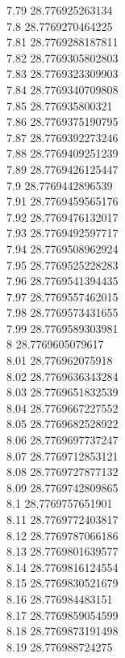 {7.79	28.776925263134\\
7.8	28.7769270464225\\
7.81	28.7769288187811\\
7.82	28.7769305802803\\
7.83	28.7769323309903\\
7.84	28.7769340709808\\
7.85	28.776935800321\\
7.86	28.7769375190795\\
7.87	28.7769392273246\\
7.88	28.7769409251239\\
7.89	28.7769426125447\\
7.9	28.7769442896539\\
7.91	28.7769459565176\\
7.92	28.7769476132017\\
7.93	28.7769492597717\\
7.94	28.7769508962924\\
7.95	28.7769525228283\\
7.96	28.7769541394435\\
7.97	28.7769557462015\\
7.98	28.7769573431655\\
7.99	28.7769589303981\\
8	28.7769605079617\\
8.01	28.776962075918\\
8.02	28.7769636343284\\
8.03	28.7769651832539\\
8.04	28.7769667227552\\
8.05	28.7769682528922\\
8.06	28.7769697737247\\
8.07	28.7769712853121\\
8.08	28.7769727877132\\
8.09	28.7769742809865\\
8.1	28.7769757651901\\
8.11	28.7769772403817\\
8.12	28.7769787066186\\
8.13	28.7769801639577\\
8.14	28.7769816124554\\
8.15	28.7769830521679\\
8.16	28.776984483151\\
8.17	28.7769859054599\\
8.18	28.7769873191498\\
8.19	28.776988724275\\
}
